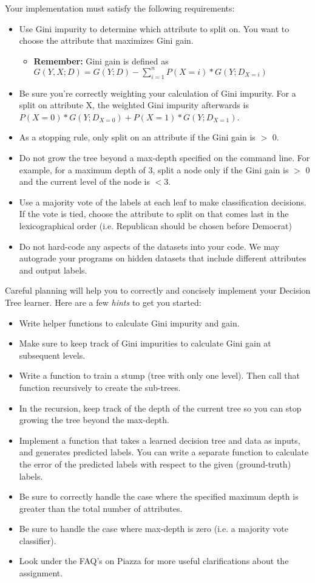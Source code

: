 Your implementation must satisfy the following requirements:
\begin{itemize}
\item Use Gini impurity to determine which attribute to split on. You want to choose the attribute that maximizes Gini gain.
\begin{itemize}
    \item \textbf{Remember:} Gini gain is defined as $G(Y,X;D)=G(Y;D)-\sum_{i=1}^{n}{P(X=i)*G(Y;D_{X=i})}$
\end{itemize}
\item Be sure you're correctly weighting your calculation of Gini impurity. For a split on attribute X, the weighted Gini impurity afterwards is $P(X=0)*G(Y;D_{X=0})+P(X =1)*G(Y;D_{X=1})$.  
\item As a stopping rule, only split on an attribute if the Gini gain is $>$ 0. 
\item Do not grow the tree beyond a max-depth specified on the command line. For example, for a maximum depth of 3, split a node only if the Gini gain is $>$ 0 and the current level of the node is $< 3$.
\item Use a majority vote of the labels at each leaf to make classification decisions. If the vote is tied, choose the attribute to split on that comes last in the lexicographical order (i.e. Republican should be chosen before Democrat)
\item Do not hard-code any aspects of the datasets into your code. We may autograde your programs on hidden datasets that include different attributes and output labels.
\end{itemize}

Careful planning will help you to correctly and concisely implement your Decision Tree learner. Here are a few \emph{hints} to get you started:
\begin{itemize}
    \item Write helper functions to calculate Gini impurity and gain.
    \item Make sure to keep track of Gini impurities to calculate Gini gain at subsequent levels. 
    \item Write a function to train a stump (tree with only one level). Then call that function recursively to create the sub-trees.
    \item In the recursion, keep track of the depth of the current tree so you can stop growing the tree beyond the max-depth.
    \item Implement a function that takes a learned decision tree and data as inputs, and generates predicted labels. You can write a separate function to calculate the error of the predicted labels with respect to the given (ground-truth) labels.
    \item Be sure to correctly handle the case where the specified maximum depth is greater than the total number of attributes.
    \item Be sure to handle the case where max-depth is zero (i.e. a majority vote classifier). 
    \item Look under the FAQ's on Piazza for more useful clarifications about the assignment.
\end{itemize}

